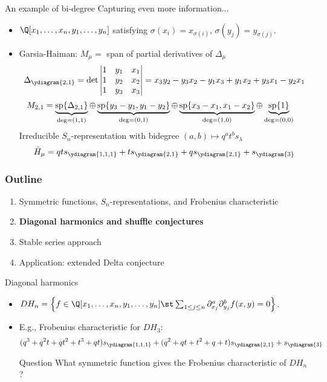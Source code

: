 \documentclass{beamer}
\renewcommand{\Span}{\operatorname{sp}}
\begin{document}
\begin{frame}{An example of bi-degree}
  Capturing even more information...\pause
  \begin{itemize}
  \item \(\Q[x_1,\ldots,x_n,y_1,\ldots,y_n]\) satisfying
    \(\sigma(x_i) = x_{\sigma(i)}\), \(\sigma(y_j) = y_{\sigma(j)}\).\pause
  \item Garsia-Haiman: \(M_\mu = \) span of partial derivatives of
    \(\Delta_\mu\) \pause \[
      \Delta_{\ydiagram{2,1}} = \det \left|
        \begin{matrix}
          1 & y_1 & x_1 \\
          1 & y_2 & x_2 \\
          1 & y_3 & x_3
        \end{matrix}
      \right| = x_3 y_2 - y_3 x_2 - y_1 x_3 + y_1 x_2 + y_3 x_1 - y_2 x_1
    \]
    \pause
  \[
    \hspace{-1em}
      M_{2,1} = \underbrace{\Span\{\Delta_{2,1}\}}_{\deg = (1,1)}
      \oplus \underbrace{\Span\{y_3-y_1, y_1 - y_2\}}_{\deg = (0,1)}
      \oplus \underbrace{\Span\{x_3-x_1, x_1 - x_2\}}_{\deg = (1,0)}
      \oplus \underbrace{\Span \{1\}}_{\deg = (0,0)}
    \]
    \pause
    Irreducible \(S_n\)-representation with bidegree \((a,b) \mapsto
    q^at^b s_\lambda\) \pause \[
      \tilde{H}_\mu = qt s_{\ydiagram{1,1,1}} + t
      s_{\ydiagram{2,1}} + q s_{\ydiagram{2,1}} + s_{\ydiagram{3}}
    \]
  \end{itemize}
\end{frame}
\begin{frame}
  \frametitle{Outline}
  \begin{enumerate}
  \item Symmetric functions, \(S_n\)-representations, and Frobenius characteristic
  \item {\bf Diagonal harmonics and shuffle conjectures}
  \item {Stable series approach}
  \item Application: extended Delta conjecture
  \end{enumerate}
\end{frame}
\begin{frame}{Diagonal harmonics}
  \begin{itemize}
  \item \(DH_n = \left\{ f \in \Q[x_1,\ldots,x_n,y_1,\ldots,y_n] \st
    \sum_{1 \leq j \leq n} \partial_{x_j}^a \partial_{y_j}^b f(x,y) =
    0 \right\}\).\pause
  \item E.g., Frobenius characteristic for \(DH_3\):
  \[
    (q^3+q^2t+qt^2+t^3+qt)s_{\ydiagram{1, 1, 1}} + (q^2+qt+t^2+q+t)s_{\ydiagram{2, 1}} + s_{\ydiagram{3}}
  \]\pause
  \begin{block}{Question}
    What symmetric function gives the Frobenius characteristic of \(DH_n\)?
  \end{block}
    \end{itemize}
\end{frame}
\end{document}
